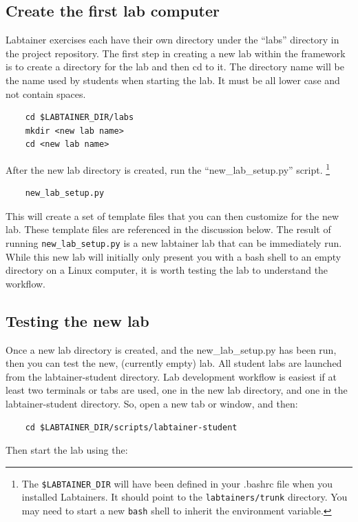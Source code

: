 \documentclass[12pt]{article}
\begin{document}
\subsection{Create the first lab computer}
Labtainer exercises each have their own
directory under the ``labs'' directory in the project repository.
The first step in creating a new lab within the framework is to create
a directory for the lab and then cd to it.  The directory name will be the name
used by students when starting the lab.  It must be all lower case and not contain spaces.
\begin{verbatim}
    cd $LABTAINER_DIR/labs
    mkdir <new lab name>
    cd <new lab name>
\end{verbatim}

\noindent After the new lab directory is created, run the ``new\_lab\_setup.py'' script.
\footnote {The {\tt \$LABTAINER\_DIR} will have been defined in your .bashrc
file when you installed Labtainers.  It should point to the {\tt labtainers/trunk}
directory.  You may need to start a new {\tt bash} shell to inherit the environment
variable.}

\begin{verbatim}
    new_lab_setup.py
\end{verbatim}
This will create a set of template files that you can then customize
for the new lab.  These template files are referenced in the discussion
below.
The result of running {\tt new\_lab\_setup.py} is a new labtainer lab that can be immediately run.  
While this new lab will initially only present you with a bash shell to an
empty directory on a Linux computer, it is worth testing the lab to understand the workflow.

\subsection{Testing the new lab}
Once a new lab directory is created, and the new\_lab\_setup.py has been run, then 
you can test the new, (currently empty) lab.  All student labs are launched from the
labtainer-student directory.  Lab development workflow is easiest if at least two
terminals or tabs are used, one in the new lab directory, and one in the labtainer-student
directory.  So, open a new tab or window, and then:

\begin{verbatim}
    cd $LABTAINER_DIR/scripts/labtainer-student
\end{verbatim}
Then start the lab using the:
\end{document}

